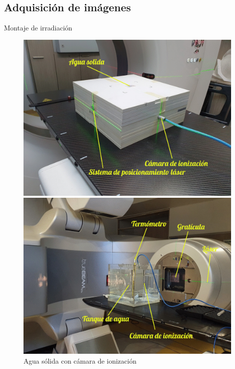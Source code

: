 \documentclass[12pt]{beamer}
\begin{document}
\subsection{Adquisición de imágenes}

\begin{frame}{Montaje de irradiación}
\begin{figure}[htp]%
	\centering
	\begin{minipage}{0.4\textwidth}
		\includegraphics[width=\textwidth]{images/elctrometro.jpg}
		\caption{Agua sólida con cámara de ionización}
	\end{minipage}\hfill
	\begin{minipage}{0.4\textwidth}
		\includegraphics[width=\textwidth]{images/TRS398Editado2.jpg}

\end{minipage}
\end{figure}
\end{frame}
\end{document}
